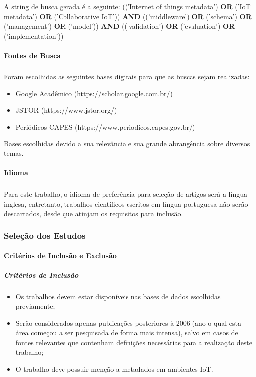 \quad A string de busca gerada é a seguinte:
(('Internet of things metadata') \textbf{OR} ('IoT metadata') \textbf{OR} ('Collaborative IoT')) \textbf{AND} (('middleware') \textbf{OR} ('schema') \textbf{OR} ('management') \textbf{OR} ('model')) \textbf{AND} (('validation') \textbf{OR} ('evaluation') \textbf{OR} ('implementation'))

\paragraph{Fontes de Busca}
\subparagraph{}
 Foram escolhidas as seguintes bases digitais para que as buscas sejam realizadas:
\begin{itemize}
  \item Google Acadêmico (https://scholar.google.com.br/)
  \item JSTOR (https://www.jstor.org/)
  \item Periódicos CAPES (https://www.periodicos.capes.gov.br/)
\end{itemize}
\quad Bases escolhidas devido a sua relevância e sua grande abrangência sobre diversos temas.

\paragraph{Idioma}
\subparagraph{}
\quad Para este trabalho, o idioma de preferência para seleção de artigos será a língua inglesa, entretanto, trabalhos científicos escritos em
língua portuguesa não serão descartados, desde que atinjam os requisitos para inclusão.

\subsubsection{Seleção dos Estudos}
\paragraph{Critérios de Inclusão e Exclusão}
\subparagraph{Critérios de Inclusão}
\begin{itemize}
  \item Os trabalhos devem estar disponíveis nas bases de dados escolhidas previamente;
  \item Serão considerados apenas publicações posteriores à 2006 (ano o qual esta área começou a ser pesquisada de forma mais intensa), salvo em casos de fontes relevantes que contenham definições necessárias para a realização deste trabalho;
  \item O trabalho deve possuir menção a metadados em ambientes \acrlong{IoT}.
\end{itemize}

